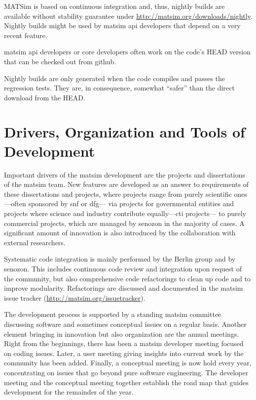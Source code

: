 MATSim is based on continuous integration and, thus, nightly builds are available without stability guarantee under \url{http://matsim.org/downloads/nightly}. Nightly builds might be used by \gls{matsim} \gls{api} developers that depend on a very recent feature. 

\gls{matsim} \gls{api} developers or core developers often work on the code's HEAD version that can be checked out from \gls{github}.

Nightly builds are only generated when the code compiles and passes the regression tests.  They are, in consequence, somewhat ``safer'' than the direct download from the HEAD.

\section{Drivers, Organization and Tools of Development}
Important drivers of the \gls{matsim} development are the projects and dissertations of the \gls{matsim} team. 
New features are developed as an answer to requirements of these dissertations and projects, where projects range 
%
from purely scientific ones---often sponsored by \gls{snf} or \gls{dfg}---%
%
via projects for governmental entities
%
and projects where science and industry contribute equally---\eg \gls{cti} projects---%
%
to purely 
commercial projects, which are managed by \gls{senozon} in the majority of cases. 
%
A significant amount of innovation is also introduced by the collaboration with external researchers.

Systematic code integration is mainly performed by the Berlin group and by \gls{senozon}. 
This includes continuous code review and integration upon request of the community, but also comprehensive code refactorings to clean up
code and to 
improve modularity.  Refactorings are discussed and documented in the \gls{matsim} issue tracker (\url{http://matsim.org/issuetracker}).

The development process is supported by a standing \gls{matsim} committee discussing software and sometimes conceptual issues on a regular basis. 
Another element bringing in innovation but also organization are the annual meetings. 
Right from the beginnings, there has been a \gls{matsim} developer meeting focused on coding issues. 
Later, a user meeting giving insights into current work by the community has been added.
Finally, a conceptual meeting is now hold every year,
concentrating on issues that go beyond pure software engineering. 
The developer meeting and the conceptual meeting 
together establish the road map that guides development for the remainder of the year. 
%

